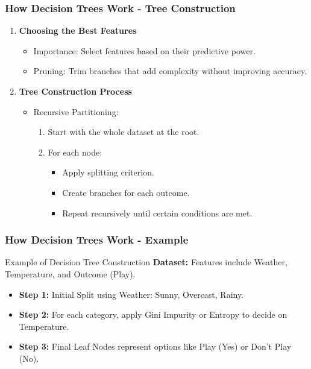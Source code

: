 \documentclass[aspectratio=169]{beamer}
\begin{document}
\begin{frame}[fragile]
    \frametitle{How Decision Trees Work - Tree Construction}
    \begin{enumerate}
        \item \textbf{Choosing the Best Features}
        \begin{itemize}
            \item Importance: Select features based on their predictive power.
            \item Pruning: Trim branches that add complexity without improving accuracy.
        \end{itemize}
        
        \item \textbf{Tree Construction Process}
        \begin{itemize}
            \item Recursive Partitioning:
            \begin{enumerate}
                \item Start with the whole dataset at the root.
                \item For each node:
                \begin{itemize}
                    \item Apply splitting criterion.
                    \item Create branches for each outcome.
                    \item Repeat recursively until certain conditions are met.
                \end{itemize}
            \end{enumerate}
        \end{itemize}
    \end{enumerate}
\end{frame}

\begin{frame}[fragile]
    \frametitle{How Decision Trees Work - Example}
    \begin{block}{Example of Decision Tree Construction}
        \textbf{Dataset:} Features include Weather, Temperature, and Outcome (Play).
    \end{block}
    \begin{itemize}
        \item \textbf{Step 1:} Initial Split using Weather: Sunny, Overcast, Rainy.
        \item \textbf{Step 2:} For each category, apply Gini Impurity or Entropy to decide on Temperature.
        \item \textbf{Step 3:} Final Leaf Nodes represent options like Play (Yes) or Don't Play (No).
    \end{itemize}
\end{frame}
\end{document}
